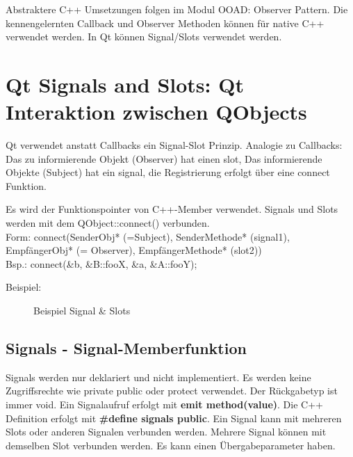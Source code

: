 Abstraktere C++ Umsetzungen folgen im Modul OOAD: Observer Pattern. 
Die kennengelernten Callback und Observer Methoden können für native C++ verwendet werden. In Qt können Signal/Slots verwendet werden.

\section{Qt Signals and Slots: Qt Interaktion zwischen QObjects}

Qt verwendet anstatt Callbacks ein Signal-Slot Prinzip. Analogie zu Callbacks: Das zu informierende Objekt (Observer) hat einen slot, Das informierende Objekte (Subject) hat ein signal, die Registrierung erfolgt über eine connect Funktion. 

Es wird der Funktionspointer von C++-Member verwendet. Signals und Slots werden mit dem QObject::connect() verbunden. \\ 
Form: connect(SenderObj* (=Subject), SenderMethode* (signal1), EmpfängerObj* (= Observer), EmpfängerMethode* (slot2)) \\
Bsp.: connect(\&b, \&B::fooX, \&a, \&A::fooY);

Beispiel: 
\begin{figure}[ht]
	\centering
	\caption[]{Beispiel Signal \& Slots}
\end{figure}


\subsection{Signals - Signal-Memberfunktion}
Signals werden nur deklariert und nicht implementiert. Es werden keine Zugriffsrechte wie private public oder protect verwendet. Der Rückgabetyp ist immer void. Ein Signalaufruf erfolgt mit \textbf{emit method(value)}. Die C++ Definition erfolgt mit \textbf{\#define signals public}. Ein Signal kann mit mehreren Slots oder anderen Signalen verbunden werden. Mehrere Signal können mit demselben Slot verbunden werden. Es kann einen Übergabeparameter haben.

